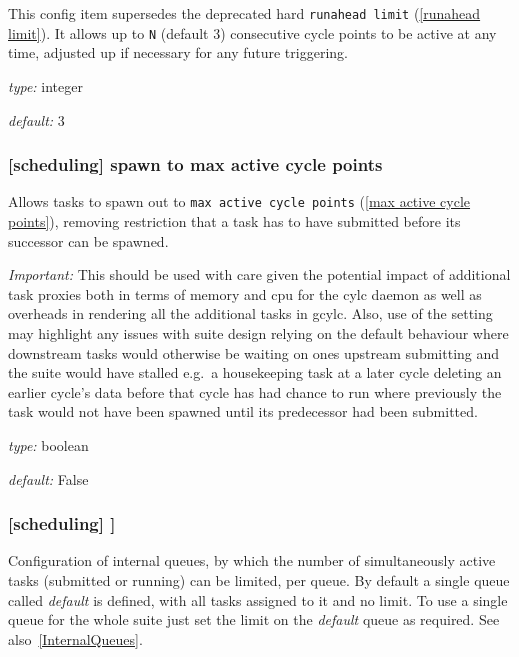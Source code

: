 This config item supersedes the deprecated hard \lstinline=runahead limit=
(\ref{runahead limit}). It allows up to \lstinline=N= (default 3) consecutive
cycle points to be active at any time, adjusted up if necessary for
any future triggering.

\begin{myitemize}
    \item {\em type:} integer
    \item {\em default:} 3
\end{myitemize}

\subsubsection[spawn to max active cycle points]{[scheduling] \textrightarrow
 spawn to max active cycle points}
\label{spawn to max active cycle points}

Allows tasks to spawn out to \lstinline=max active cycle points=
(\ref{max active cycle points}), removing restriction that a task has to have
submitted before its successor can be spawned.

{\em Important:} This should be used with care given the potential impact of
additional task proxies both in terms of memory and cpu for the cylc daemon as
well as overheads in rendering all the additional tasks in gcylc. Also, use
of the setting may highlight any issues with suite design relying on the
default behaviour where downstream tasks would otherwise be waiting on ones
upstream submitting and the suite would have stalled e.g.\  a housekeeping task
at a later cycle deleting an earlier cycle's data before that cycle has had
chance to run where previously the task would not have been spawned until its
predecessor had been submitted.

\begin{myitemize}
    \item {\em type:} boolean
    \item {\em default:} False
\end{myitemize}

\subsubsection[{[[}queues{]]}]{[scheduling] \textrightarrow [[queues]]}

Configuration of internal queues, by which the number of simultaneously
active tasks (submitted or running) can be limited, per queue. By
default a single queue called {\em default} is defined, with all tasks
assigned to it and no limit. To use a single queue for the whole suite
just set the limit on the {\em default} queue as required.
See also~\ref{InternalQueues}.

